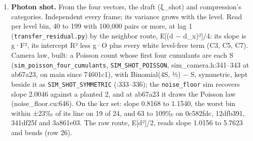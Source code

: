 \begin{enumerate}
\item \textbf{Photon shot.} From the four vectors, the draft (ξ\_\allowbreak{}shot) and compression's categories. Independent every frame; its variance grows with the level. Read per level bin, 40 to 199 with 100,000 pairs or more, at lag 1 (\texttt{transfer\_\allowbreak{}residual.\allowbreak{}py}) by the neighbor route, E[(d − d\_\allowbreak{}x)²]/4: its slope is g·F², its intercept R² less g·O plus every white level-free term (C3, C5, C7). Camera law, built: a Poisson count whose first four cumulants are each S (\texttt{sim\_\allowbreak{}poisson\_\allowbreak{}four\_\allowbreak{}cumulants}, \texttt{SIM\_\allowbreak{}SHOT\_\allowbreak{}POISSON}, sim\_\allowbreak{}camera.h:341–343 at ab67a23, on main since 74601c1), with Binomial(4S, ½) − S, symmetric, kept beside it as \texttt{SIM\_\allowbreak{}SHOT\_\allowbreak{}SYMMETRIC} (:333–336); the \texttt{noise\_\allowbreak{}floor} sim recovers slope 2.0046 against a planted 2, and at ab67a23 it draws the Poisson law (noise\_\allowbreak{}floor.cu:646). On the kcr set: slope 0.8168 to 1.1540, the worst bin within ±23‰ of its line on 19 of 24, and 63 to 109‰ on 0c582fdc, 12dfb391, 341df25f and 3a861e03. The raw route, E[d²]/2, reads slope 1.0156 to 5.7623 and bends (row 26).


\end{enumerate}
